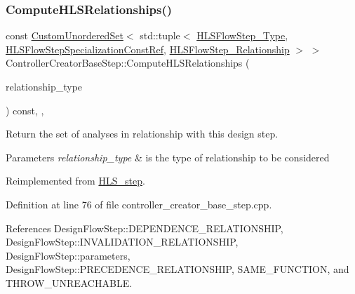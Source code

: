 \subsubsection{\texorpdfstring{Compute\+H\+L\+S\+Relationships()}{ComputeHLSRelationships()}}
{\footnotesize\ttfamily const \hyperlink{classCustomUnorderedSet}{Custom\+Unordered\+Set}$<$ std\+::tuple$<$ \hyperlink{hls__step_8hpp_ada16bc22905016180e26fc7e39537f8d}{H\+L\+S\+Flow\+Step\+\_\+\+Type}, \hyperlink{hls__step_8hpp_a5fdd2edf290c196531d21d68e13f0e74}{H\+L\+S\+Flow\+Step\+Specialization\+Const\+Ref}, \hyperlink{hls__step_8hpp_a3ad360b9b11e6bf0683d5562a0ceb169}{H\+L\+S\+Flow\+Step\+\_\+\+Relationship} $>$ $>$ Controller\+Creator\+Base\+Step\+::\+Compute\+H\+L\+S\+Relationships (\begin{DoxyParamCaption}\item[{const \hyperlink{classDesignFlowStep_a723a3baf19ff2ceb77bc13e099d0b1b7}{Design\+Flow\+Step\+::\+Relationship\+Type}}]{relationship\+\_\+type }\end{DoxyParamCaption}) const\hspace{0.3cm}{\ttfamily [override]}, {\ttfamily [protected]}, {\ttfamily [virtual]}}



Return the set of analyses in relationship with this design step. 


\begin{DoxyParams}{Parameters}
{\em relationship\+\_\+type} & is the type of relationship to be considered \\
\hline
\end{DoxyParams}


Reimplemented from \hyperlink{classHLS__step_aed0ce8cca9a1ef18e705fc1032ad4de5}{H\+L\+S\+\_\+step}.



Definition at line 76 of file controller\+\_\+creator\+\_\+base\+\_\+step.\+cpp.



References Design\+Flow\+Step\+::\+D\+E\+P\+E\+N\+D\+E\+N\+C\+E\+\_\+\+R\+E\+L\+A\+T\+I\+O\+N\+S\+H\+IP, Design\+Flow\+Step\+::\+I\+N\+V\+A\+L\+I\+D\+A\+T\+I\+O\+N\+\_\+\+R\+E\+L\+A\+T\+I\+O\+N\+S\+H\+IP, Design\+Flow\+Step\+::parameters, Design\+Flow\+Step\+::\+P\+R\+E\+C\+E\+D\+E\+N\+C\+E\+\_\+\+R\+E\+L\+A\+T\+I\+O\+N\+S\+H\+IP, S\+A\+M\+E\+\_\+\+F\+U\+N\+C\+T\+I\+ON, and T\+H\+R\+O\+W\+\_\+\+U\+N\+R\+E\+A\+C\+H\+A\+B\+LE.

\mbox{\label{classControllerCreatorBaseStep_a1446309080149bf6370ae3a9d1e18feb}} 
